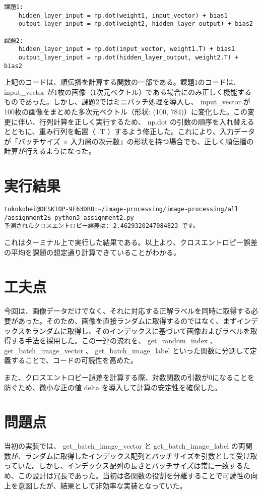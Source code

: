 \documentclass[11px,a4paper]{jsarticle}
\begin{document}
\begin{verbatim}
課題1:
    hidden_layer_input = np.dot(weight1, input_vector) + bias1
    output_layer_input = np.dot(weight2, hidden_layer_output) + bias2

課題2: 
    hidden_layer_input = np.dot(input_vector, weight1.T) + bias1
    output_layer_input = np.dot(hidden_layer_output, weight2.T) + bias2
\end{verbatim}
上記のコードは、順伝播を計算する関数の一部である。課題1のコードは、 input\_vector が1枚の画像（1次元ベクトル）である場合にのみ正しく機能するものであった。しかし、課題2ではミニバッチ処理を導入し、 input\_vector が100枚の画像をまとめた多次元ベクトル（形状: (100, 784)）に変化した。この変更に伴い、行列計算を正しく実行するため、 np.dot の引数の順序を入れ替えるとともに、重み行列を転置（ .T ）するよう修正した。これにより、入力データが「バッチサイズ × 入力層の次元数」の形状を持つ場合でも、正しく順伝播の計算が行えるようになった。

\section{実行結果}
\begin{verbatim}
tokokohei@DESKTOP-9F63DRB:~/image-processing/image-processing/all
/assignment2$ python3 assignment2.py 
予測されたクロスエントロピー誤差は: 2.4629320247084823 です。
\end{verbatim}
これはターミナル上で実行した結果である。以上より、クロスエントロピー誤差の平均を課題の想定通り計算できていることがわかる。

\section{工夫点}
今回は、画像データだけでなく、それに対応する正解ラベルを同時に取得する必要があった。そのため、画像を直接ランダムに取得するのではなく、まずインデックスをランダムに取得し、そのインデックスに基づいて画像およびラベルを取得する手法を採用した。この一連の流れを、 get\_random\_index 、 get\_batch\_image\_vector 、 get\_batch\_image\_label といった関数に分割して定義することで、コードの可読性を高めた。

また、クロスエントロピー誤差を計算する際、対数関数の引数が0になることを防ぐため、微小な正の値 delta を導入して計算の安定性を確保した。

\section{問題点}
当初の実装では、 get\_batch\_image\_vector と get\_batch\_image\_label の両関数が、ランダムに取得したインデックス配列とバッチサイズを引数として受け取っていた。しかし、インデックス配列の長さとバッチサイズは常に一致するため、この設計は冗長であった。当初は各関数の役割を分離することで可読性の向上を意図したが、結果として非効率な実装となっていた。
\end{document}
